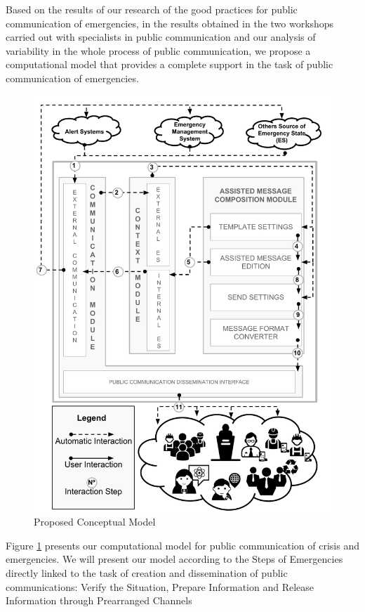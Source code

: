 Based on the results of our research of the good practices for public communication of emergencies, in the results obtained in the two workshops carried out with specialists in public communication and our analysis of variability in the whole process of public communication, we propose a computational model that provides a complete support in the task of public communication of emergencies.   

\begin{figure}[ht!]
\begin{center}
  \includegraphics[width=\linewidth, keepaspectratio]{images/ConceptualModel.pdf}
\caption{Proposed Conceptual Model}
\label{fig:ConceptualModel}
\end{center}
\end{figure}

Figure \ref{fig:ConceptualModel} presents our computational model for public communication of crisis and emergencies. We will present our model according to the Steps of Emergencies directly linked to the task of creation and dissemination of public communications: Verify the Situation, Prepare Information and Release Information through Prearranged Channels

